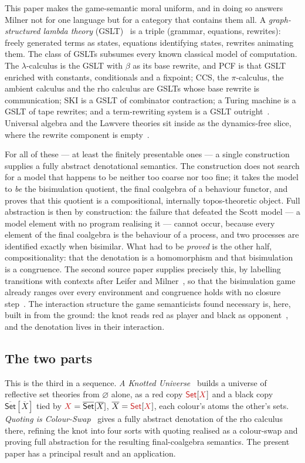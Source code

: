 \documentclass[11pt]{article}
\newcommand{\rc}[1]{\textcolor{redcopy}{#1}}   %
\newcommand{\rSet}{\rc{\mathsf{Set}}}          %
\newcommand{\bSet}{\overline{\mathsf{Set}}}    %
\newcommand{\rX}{\rc{X}}
\theoremstyle{plain}
\theoremstyle{definition}
\theoremstyle{remark}
\begin{document}
This paper makes the game-semantic moral uniform, and in doing so answers Milner not for one language
but for a category that contains them all. A \emph{graph-structured lambda theory}
(GSLT)~\cite{gsltnotes} is a triple (grammar, equations, rewrites): freely generated terms as states,
equations identifying states, rewrites animating them. The class of GSLTs subsumes every known
classical model of computation. The $\lambda$-calculus is the GSLT with $\beta$ as its base rewrite,
and PCF is that GSLT enriched with constants, conditionals and a fixpoint; CCS, the $\pi$-calculus,
the ambient calculus and the rho calculus are GSLTs whose base rewrite is communication; SKI is a
GSLT of combinator contraction; a Turing machine is a GSLT of tape rewrites; and a term-rewriting
system is a GSLT outright~\cite{baadernipkow}. Universal algebra and the Lawvere theories sit inside as the
dynamics-free slice, where the rewrite component is empty~\cite{gsltnotes}.

For all of these --- at least the finitely presentable ones --- a single construction supplies a
fully abstract denotational semantics. The construction does not search for a model that happens to
be neither too coarse nor too fine; it takes the model to \emph{be} the bisimulation quotient, the
final coalgebra of a behaviour functor, and proves that this quotient is a compositional, internally
topos-theoretic object. Full abstraction is then by construction: the failure that defeated the
Scott model --- a model element with no program realising it --- cannot occur, because every element
of the final coalgebra is the behaviour of a process, and two processes are identified exactly when
bisimilar. What had to be \emph{proved} is the other half, compositionality: that the denotation is a
homomorphism and that bisimulation is a congruence. The second source paper supplies precisely this,
by labelling transitions with contexts after Leifer and Milner~\cite{leifermilner,sewell}, so that
the bisimulation game already ranges over every environment and congruence holds with no closure
step~\cite{knotrho}. The interaction structure the game semanticists found necessary is, here, built
in from the ground: the knot reads red as player and black as opponent~\cite{rset}, and the
denotation lives in their interaction.

\subsection{The two parts}

This is the third in a sequence. \emph{A Knotted Universe}~\cite{rset} builds a universe of reflective
set theories from $\varnothing$ alone, as a red copy $\rSet[\rX]$ and a black copy
$\bSet[\overline X]$ tied by $\rX=\bSet[\overline X]$, $\overline X=\rSet[\rX]$, each colour's atoms
the other's sets. \emph{Quoting is Colour-Swap}~\cite{knotrho} gives a fully abstract denotation of
the rho calculus~\cite{rho} there, refining the knot into four sorts with quoting realised as a
colour-swap and proving full abstraction for the resulting final-coalgebra semantics. The present
paper has a principal result and an application.
\end{document}
